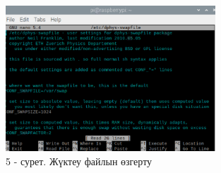\begin{figure}[H]
	\centering
	\includegraphics[width=0.7\textwidth]{media/ict2/image164}
	\caption*{5 - сурет. Жүктеу файлын өзгерту}
\end{figure}

